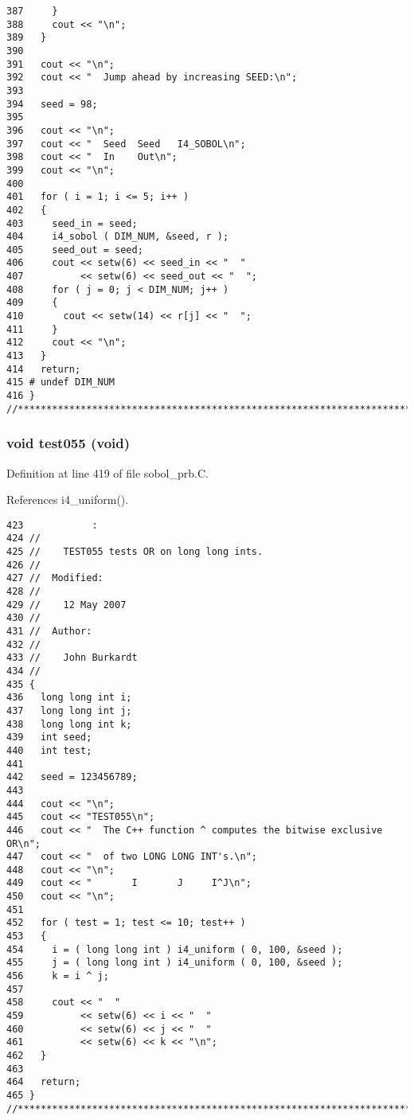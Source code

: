 \begin{Code}
\begin{verbatim}
387     }
388     cout << "\n";
389   }
390 
391   cout << "\n";
392   cout << "  Jump ahead by increasing SEED:\n";
393 
394   seed = 98;
395 
396   cout << "\n";
397   cout << "  Seed  Seed   I4_SOBOL\n";
398   cout << "  In    Out\n";
399   cout << "\n";
400 
401   for ( i = 1; i <= 5; i++ )
402   {
403     seed_in = seed;
404     i4_sobol ( DIM_NUM, &seed, r );
405     seed_out = seed;
406     cout << setw(6) << seed_in << "  "
407          << setw(6) << seed_out << "  ";
408     for ( j = 0; j < DIM_NUM; j++ )
409     {
410       cout << setw(14) << r[j] << "  ";
411     }
412     cout << "\n";
413   }
414   return;
415 # undef DIM_NUM
416 }
//****************************************************************************80
\end{verbatim}
\end{Code}


\subsubsection{\setlength{\rightskip}{0pt plus 5cm}void test055 (void)}\label{sobol__prb_8C_b7b4ea27c42b764b7a146c2c1e61b6e4}




Definition at line 419 of file sobol\_\-prb.C.

References i4\_\-uniform().

\begin{Code}\begin{verbatim}423            :
424 //
425 //    TEST055 tests OR on long long ints.
426 //
427 //  Modified:
428 //
429 //    12 May 2007
430 //
431 //  Author:
432 //
433 //    John Burkardt
434 //
435 {
436   long long int i;
437   long long int j;
438   long long int k;
439   int seed;
440   int test;
441 
442   seed = 123456789;
443 
444   cout << "\n";
445   cout << "TEST055\n";
446   cout << "  The C++ function ^ computes the bitwise exclusive OR\n";
447   cout << "  of two LONG LONG INT's.\n";
448   cout << "\n";
449   cout << "       I       J     I^J\n";
450   cout << "\n";
451 
452   for ( test = 1; test <= 10; test++ )
453   {
454     i = ( long long int ) i4_uniform ( 0, 100, &seed );
455     j = ( long long int ) i4_uniform ( 0, 100, &seed );
456     k = i ^ j;
457 
458     cout << "  "
459          << setw(6) << i << "  "
460          << setw(6) << j << "  "
461          << setw(6) << k << "\n";
462   }
463 
464   return;
465 }
//****************************************************************************80
\end{verbatim}
\end{Code}


